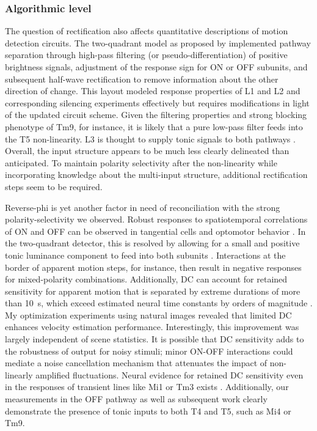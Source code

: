 \subsubsection{Algorithmic level}
The question of rectification also affects quantitative descriptions of motion detection circuits. The two-quadrant model as proposed by \citet{Eichner:2011ic} implemented pathway separation through high-pass filtering (or pseudo-differentiation) of positive brightness signals, adjustment of the response sign for ON or OFF subunits, and subsequent half-wave rectification to remove information about the other direction of change. This layout modeled response properties of L1 and L2 and corresponding silencing experiments effectively \citep{Laughlin:1978aa,Joesch:2010fw,Joesch:2013ew} but requires modifications in light of the updated circuit scheme. Given the filtering properties and strong blocking phenotype of Tm9, for instance, it is likely that a pure low-pass filter feeds into the T5 non-linearity. L3 is thought to supply tonic signals to both pathways \citep{Silies:2013jp,Takemura:2017aa}. Overall, the input structure appears to be much less clearly delineated than anticipated. To maintain polarity selectivity after the non-linearity while incorporating knowledge about the multi-input structure, additional rectification steps seem to be required.

Reverse-phi is yet another factor in need of reconciliation with the strong polarity-selectivity we observed. Robust responses to spatiotemporal correlations of ON and OFF can be observed in tangential cells \citep{Egelhaaf:1992wh,Eichner:2011ic} and optomotor behavior \citep{Tuthill:2011ic,Clark:2011gw}. In the two-quadrant detector, this is resolved by allowing for a small and positive tonic luminance component to feed into both subunits \citep[see also][]{Kern:2000a}. Interactions at the border of apparent motion steps, for instance, then result in negative responses for mixed-polarity combinations. Additionally, DC can account for retained sensitivity for apparent motion that is separated by extreme durations of more than \SI{10}{\second}, which exceed estimated neural time constants by orders of magnitude \citep{Eichner:2011ic}. My optimization experiments using natural images revealed that limited DC enhances velocity estimation performance. Interestingly, this improvement was largely independent of scene statistics. It is possible that DC sensitivity adds to the robustness of output for noisy stimuli; minor ON-OFF interactions could mediate a noise cancellation mechanism that attenuates the impact of non-linearly amplified fluctuations. Neural evidence for retained DC sensitivity even in the responses of transient lines like Mi1 or Tm3 exists \citep{Behnia:2014jh}. Additionally, our measurements in the OFF pathway as well as subsequent work clearly demonstrate the presence of tonic inputs to both T4 and T5, such as Mi4 or Tm9.

